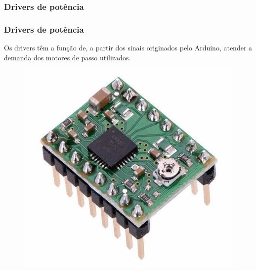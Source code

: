 \subsubsection{Drivers de potência}

\begin{frame}
\frametitle{Drivers de potência}

Os drivers têm a função de, a partir dos sinais originados pelo Arduino, atender a demanda dos motores de passo utilizados.

\begin{figure}
\centering
\includegraphics[scale = 0.2]{figs/driver}
\end{figure}

\end{frame}
